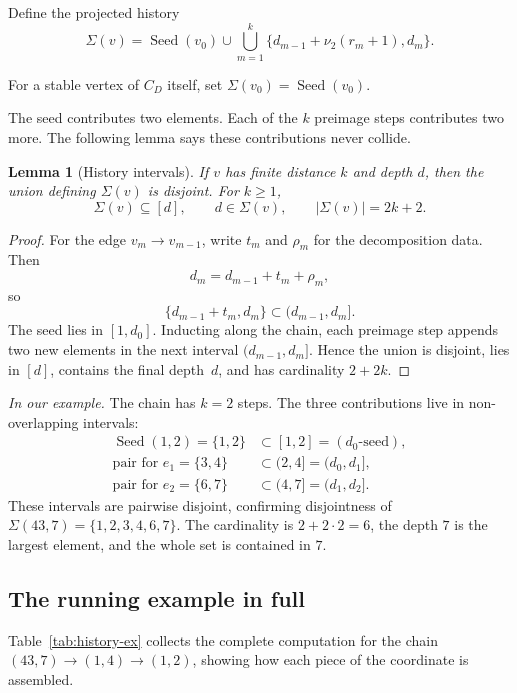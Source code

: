 \documentclass[11pt]{amsart}
\newtheorem{lemma}[theorem]{Lemma}
\theoremstyle{definition}
\theoremstyle{remark}
\newcommand{\nuu}{\nu_2}
\newcommand{\Seed}{\operatorname{Seed}}
\begin{document}
\begin{keybox}
Define the projected history
\[
\Sigma(v)=\Seed(v_0)\cup\bigcup_{m=1}^k\{d_{m-1}+\nuu(r_m+1),d_m\}.
\]
\end{keybox}

For a stable vertex of $C_D$ itself, set $\Sigma(v_0)=\Seed(v_0)$.

The seed contributes two elements.  Each of the $k$ preimage steps
contributes two more.  The following lemma says these contributions
never collide.

\begin{lemma}[History intervals]\label{lem:historyintervals}
If $v$ has finite distance $k$ and depth $d$, then the union defining
$\Sigma(v)$ is disjoint.  For $k\ge1$,
\[
\Sigma(v)\subseteq[d],\qquad d\in\Sigma(v),\qquad |\Sigma(v)|=2k+2.
\]
\end{lemma}

\begin{proof}
For the edge $v_m\to v_{m-1}$, write $t_m$ and $\rho_m$ for the
decomposition data.  Then
\[
d_m=d_{m-1}+t_m+\rho_m,
\]
so
\[
\{d_{m-1}+t_m,d_m\}\subset(d_{m-1},d_m].
\]
The seed lies in $[1,d_0]$.  Inducting along the chain, each preimage
step appends two new elements in the next interval $(d_{m-1},d_m]$.
Hence the union is disjoint, lies in $[d]$, contains the final
depth~$d$, and has cardinality $2+2k$.
\end{proof}

\textit{In our example.}
The chain has $k=2$ steps.  The three contributions live in
non-overlapping intervals:
\begin{align*}
  \Seed(1,2)=\{1,2\}&\subset[1,2]=(d_0\text{-seed}),\\
  \text{pair for }e_1=\{3,4\}&\subset(2,4]=(d_0,d_1],\\
  \text{pair for }e_2=\{6,7\}&\subset(4,7]=(d_1,d_2].
\end{align*}
These intervals are pairwise disjoint, confirming disjointness of
$\Sigma(43,7)=\{1,2,3,4,6,7\}$.  The cardinality is $2+2\cdot2=6$, the
depth $7$ is the largest element, and the whole set is contained in $7$.

\subsection{The running example in full}\label{subsec:full-example}
Table~\ref{tab:history-ex} collects the complete computation for the
chain $(43,7)\to(1,4)\to(1,2)$, showing how each piece of the
coordinate is assembled.
\end{document}
